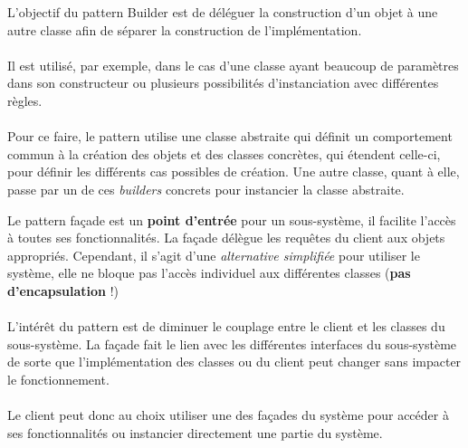 \item{}
{\vrai}
{L'objectif du pattern Builder est de déléguer la construction d'un objet à une autre classe afin de séparer la construction de l'implémentation.
\paragraph{}Il est utilisé, par exemple, dans le cas d'une classe ayant beaucoup de paramètres dans son constructeur ou plusieurs possibilités d'instanciation avec différentes règles.
\paragraph{}
Pour ce faire, le pattern utilise une classe abstraite qui définit un comportement commun à la création des objets et des classes concrètes, qui étendent celle-ci, pour définir les différents cas possibles de création. Une autre classe, quant à elle, passe par un de ces \textit{builders} concrets pour instancier la classe abstraite.
}

\item{}
{\faux}
{Le pattern façade est un \textbf{point d'entrée} pour un sous-système, il facilite l'accès à toutes ses fonctionnalités. La façade délègue les requêtes du client aux objets appropriés. Cependant, il s'agit d'une \textit{alternative simplifiée} pour utiliser le système, elle ne bloque pas l'accès individuel aux différentes classes (\textbf{pas d'encapsulation} !)
\paragraph{}
L'intérêt du pattern est de diminuer le couplage entre le client et les classes du sous-système. La façade fait le lien avec les différentes interfaces du sous-système de sorte que l'implémentation des classes ou du client peut changer sans impacter le fonctionnement.
\paragraph{}
Le client peut donc au choix utiliser une des façades du système pour accéder à ses fonctionnalités ou instancier directement une partie du système.
}

